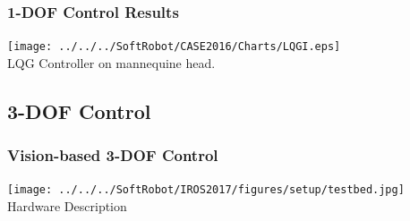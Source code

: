 %	

\begin{frame}
	\frametitle{1-DOF Control Results}
	\centering
	\texttt{[image: ../../../SoftRobot/CASE2016/Charts/LQGI.eps]}
	\\
	\centering LQG Controller on mannequine head.
\end{frame}


\subsection{3-DOF Control}

\begin{frame}
\frametitle{Vision-based 3-DOF Control}
	\centering
	\texttt{[image: ../../../SoftRobot/IROS2017/figures/setup/testbed.jpg]}
	\centering Hardware Description
\end{frame}

